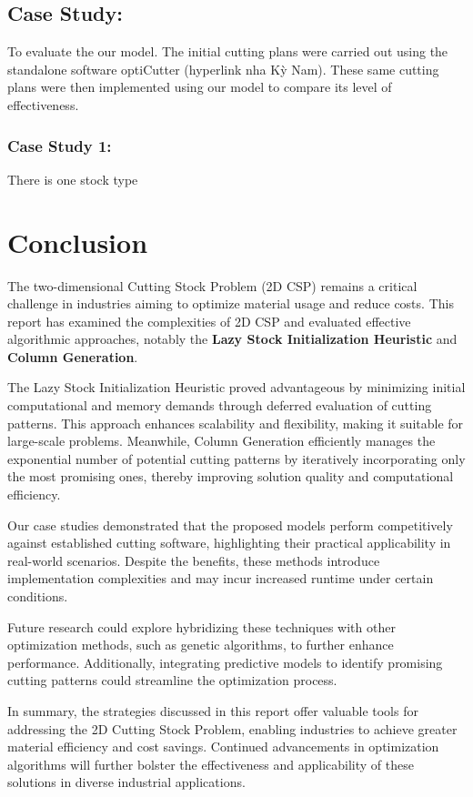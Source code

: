 \documentclass[a4paper]{article}
\begin{document}
\subsection{Case Study: }
To evaluate the our model. The initial cutting plans were carried out using the standalone software optiCutter (hyperlink nha Kỳ Nam). These same cutting plans were then implemented using our model to compare its level of effectiveness.
\subsubsection{Case Study 1:}
There is one stock type
\section{Conclusion}

The two-dimensional Cutting Stock Problem (2D CSP) remains a critical challenge in industries aiming to optimize material usage and reduce costs. This report has examined the complexities of 2D CSP and evaluated effective algorithmic approaches, notably the \textbf{Lazy Stock Initialization Heuristic} and \textbf{Column Generation}.

The Lazy Stock Initialization Heuristic proved advantageous by minimizing initial computational and memory demands through deferred evaluation of cutting patterns. This approach enhances scalability and flexibility, making it suitable for large-scale problems. Meanwhile, Column Generation efficiently manages the exponential number of potential cutting patterns by iteratively incorporating only the most promising ones, thereby improving solution quality and computational efficiency.

Our case studies demonstrated that the proposed models perform competitively against established cutting software, highlighting their practical applicability in real-world scenarios. Despite the benefits, these methods introduce implementation complexities and may incur increased runtime under certain conditions.

Future research could explore hybridizing these techniques with other optimization methods, such as genetic algorithms, to further enhance performance. Additionally, integrating predictive models to identify promising cutting patterns could streamline the optimization process.

In summary, the strategies discussed in this report offer valuable tools for addressing the 2D Cutting Stock Problem, enabling industries to achieve greater material efficiency and cost savings. Continued advancements in optimization algorithms will further bolster the effectiveness and applicability of these solutions in diverse industrial applications.
\end{document}
